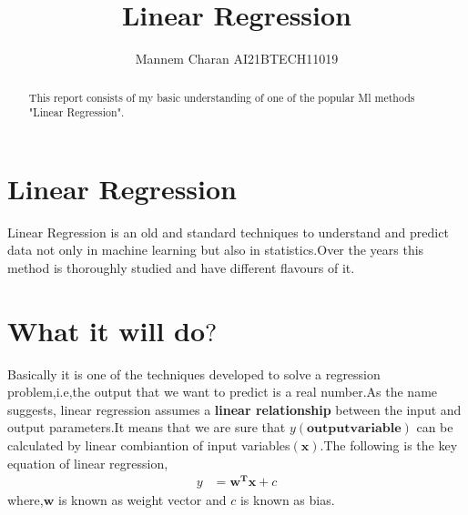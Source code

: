 \documentclass[journal,12pt,onecolumn]{IEEEtran}
\providecommand{\brak}[1]{\ensuremath{\left(#1\right)}}
\theoremstyle{remark}
\numberwithin{equation}{section}
\let\vec\mathbf
\begin{document}
   \title{ Linear Regression }
   \maketitle
   \author{ Mannem Charan AI21BTECH11019}
 \begin{abstract}
    This report consists of my basic understanding of one of the popular Ml methods "Linear Regression".
 \end{abstract}
  \section{Linear Regression}
   Linear Regression is an old and standard techniques to understand and predict data not only in machine learning but also in statistics.Over the years this method is thoroughly studied and have different flavours of it.
  \section{What it will do$?$}
  Basically it is one of the techniques developed to solve a regression problem,i.e,the output that we want to predict is a real number.As the name suggests, linear regression assumes a \textbf{linear relationship} between the input and output parameters.It means that we are sure that $y\brak{\mathbf{output variable}}$ can be calculated by linear combiantion of input variables$\brak{\mathbf{x}}$.The following is the key equation of linear regression,
        \begin{align}
		y &= \vec{w^T}\vec{x} + c \label{eq:1}
	\end{align}
	where,$\vec{w}$ is known as weight vector and $c$ is known as bias.
\end{document}
